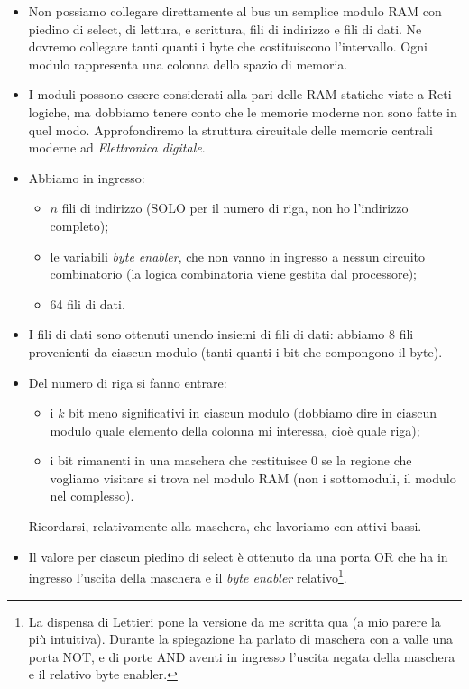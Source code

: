 			\begin{itemize}
				\item Non possiamo collegare direttamente al bus un semplice modulo RAM con piedino di select, di lettura, e scrittura, fili di indirizzo e fili di dati. Ne dovremo collegare tanti quanti i byte che costituiscono l'intervallo. Ogni modulo rappresenta una colonna dello spazio di memoria.
				\item I moduli possono essere considerati alla pari delle RAM statiche viste a Reti logiche, ma dobbiamo tenere conto che le memorie moderne non sono fatte in quel modo. Approfondiremo la struttura circuitale delle memorie centrali moderne ad \emph{Elettronica digitale}.
				\item Abbiamo in ingresso:
				\small
				\begin{itemize}
					\item $n$ fili di indirizzo (SOLO per il numero di riga, non ho l'indirizzo completo);
					\item le variabili \emph{byte enabler}, che non vanno in ingresso a nessun circuito combinatorio (la logica combinatoria viene gestita dal processore);
					\item 64 fili di dati.
				\end{itemize}
				\normalsize
				\item I fili di dati sono ottenuti unendo insiemi di fili di dati: abbiamo $8$ fili provenienti da ciascun modulo (tanti quanti i bit che compongono il byte).
				\item Del numero di riga si fanno entrare:
				\small
				\begin{itemize}
					\item i $k$ bit meno significativi in ciascun modulo (dobbiamo dire in ciascun modulo quale elemento della colonna mi interessa, cioè quale riga);
					\item i bit rimanenti in una maschera che restituisce $0$ se la regione che vogliamo visitare si trova nel modulo RAM (non i sottomoduli, il modulo nel complesso).
				\end{itemize}
				\normalsize
				Ricordarsi, relativamente alla maschera, che lavoriamo con attivi bassi.
				\item Il valore per ciascun piedino di select è ottenuto da una porta OR che ha in ingresso l'uscita della maschera e il \emph{byte enabler} relativo\footnote{La dispensa di Lettieri pone la versione da me scritta qua (a mio parere la più intuitiva). Durante la spiegazione ha parlato di maschera con a valle una porta NOT, e di porte AND aventi in ingresso l'uscita negata della maschera e il relativo byte enabler.}.
			\end{itemize}
